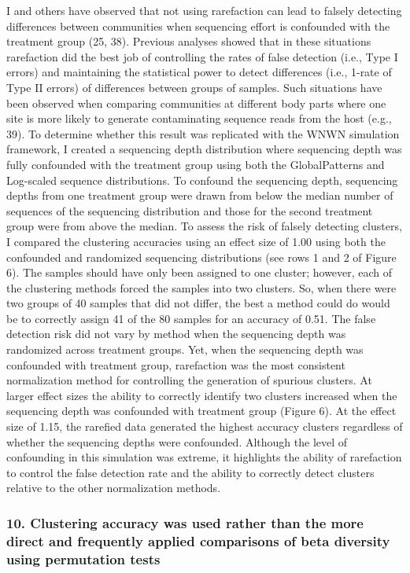 \documentclass[
]{article}
\begin{document}
I and others have observed that not using rarefaction can lead to
falsely detecting differences between communities when sequencing effort
is confounded with the treatment group (25, 38). Previous analyses
showed that in these situations rarefaction did the best job of
controlling the rates of false detection (i.e., Type I errors) and
maintaining the statistical power to detect differences (i.e., 1-rate of
Type II errors) of differences between groups of samples. Such
situations have been observed when comparing communities at different
body parts where one site is more likely to generate contaminating
sequence reads from the host (e.g., 39). To determine whether this
result was replicated with the WNWN simulation framework, I created a
sequencing depth distribution where sequencing depth was fully
confounded with the treatment group using both the GlobalPatterns and
Log-scaled sequence distributions. To confound the sequencing depth,
sequencing depths from one treatment group were drawn from below the
median number of sequences of the sequencing distribution and those for
the second treatment group were from above the median. To assess the
risk of falsely detecting clusters, I compared the clustering accuracies
using an effect size of 1.00 using both the confounded and randomized
sequencing distributions (see rows 1 and 2 of Figure 6). The samples
should have only been assigned to one cluster; however, each of the
clustering methods forced the samples into two clusters. So, when there
were two groups of 40 samples that did not differ, the best a method
could do would be to correctly assign 41 of the 80 samples for an
accuracy of 0.51. The false detection risk did not vary by method when
the sequencing depth was randomized across treatment groups. Yet, when
the sequencing depth was confounded with treatment group, rarefaction
was the most consistent normalization method for controlling the
generation of spurious clusters. At larger effect sizes the ability to
correctly identify two clusters increased when the sequencing depth was
confounded with treatment group (Figure 6). At the effect size of 1.15,
the rarefied data generated the highest accuracy clusters regardless of
whether the sequencing depths were confounded. Although the level of
confounding in this simulation was extreme, it highlights the ability of
rarefaction to control the false detection rate and the ability to
correctly detect clusters relative to the other normalization methods.

\hypertarget{clustering-accuracy-was-used-rather-than-the-more-direct-and-frequently-applied-comparisons-of-beta-diversity-using-permutation-tests}{%
\subsubsection{10. Clustering accuracy was used rather than the more
direct and frequently applied comparisons of beta diversity using
permutation
tests}\label{clustering-accuracy-was-used-rather-than-the-more-direct-and-frequently-applied-comparisons-of-beta-diversity-using-permutation-tests}}
\end{document}
